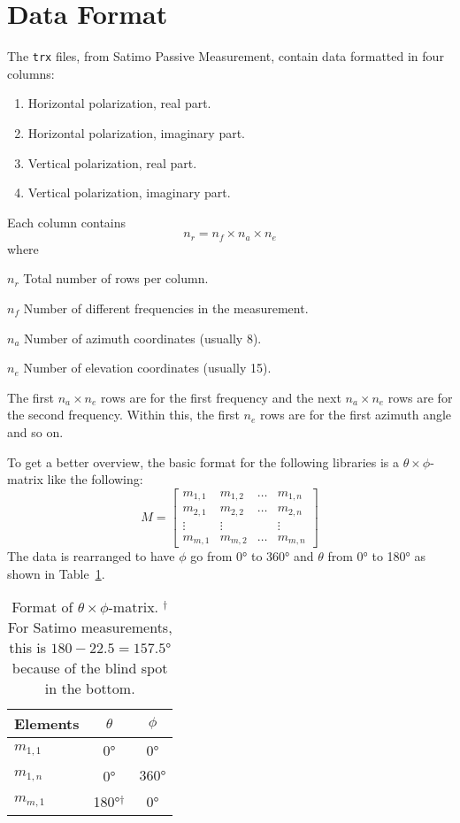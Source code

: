 \section{Data Format}
The \texttt{trx} files, from Satimo Passive Measurement, contain data formatted in four columns:
\begin{enumerate}
    \item Horizontal polarization, real part.
    \item Horizontal polarization, imaginary part.
    \item Vertical polarization, real part.
    \item Vertical polarization, imaginary part.
\end{enumerate}
Each column contains 
\begin{equation}
    n_r =  n_f \times n_a \times n_e
\end{equation}
where
\begin{where}
\item[$n_r$] Total number of rows per column.
\item[$n_f$] Number of different frequencies in the measurement.
\item[$n_a$] Number of azimuth coordinates (usually 8).
\item[$n_e$] Number of elevation coordinates (usually 15).
\end{where}
The first $n_a \times n_e$ rows are for the first frequency and the next $n_a \times n_e$ rows are for the second frequency. Within this, the first $n_e$ rows are for the first azimuth angle and so on.

To get a better overview, the basic format for the following libraries is a $\theta \times \phi$-matrix like the following:
\begin{equation}
    M = \begin{bmatrix}
        m_{1,1} & m_{1,2} & \dots & m_{1,n} \\
        m_{2,1} & m_{2,2} & \dots & m_{2,n} \\
        \vdots & \vdots & & \vdots \\
        m_{m,1} & m_{m,2} & \dots & m_{m,n}
    \end{bmatrix}
\end{equation}
The data is rearranged to have $\phi$ go from \ang{0} to \ang{360} and $\theta$ from \ang{0} to \ang{180} as shown in Table~\ref{tab:matrixformat}.

\begin{table}[htbp]
    \centering
    \begin{tabular}{|l|c|c|}
        \hline
        Elements & $\theta$ & $\phi$ \\
        \hline
        $m_{1,1}$ & \ang{0} & \ang{0} \\
        $m_{1,n}$ & \ang{0} & $\ang{360}$ \\
        $m_{m,1}$ & \ang{180}$^{\dagger}$ & \ang{0} \\
        \hline
    \end{tabular}
    \caption{Format of $\theta\times\phi$-matrix. $^{\dagger}$For Satimo measurements, this is $180-22.5=\ang{157.5}$ because of the blind spot in the bottom.}
    \label{tab:matrixformat}
\end{table}
